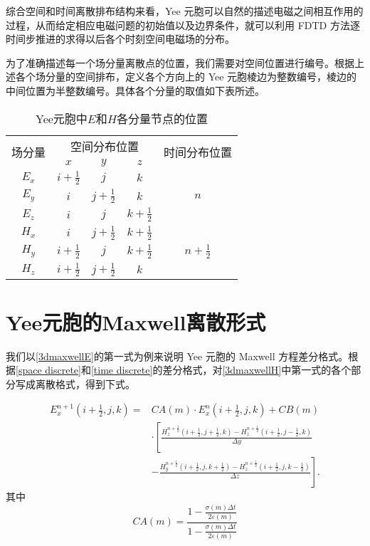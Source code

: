 综合空间和时间离散排布结构来看，Yee 元胞可以自然的描述电磁之间相互作用的过程，从而给定相应电磁问题的初始值以及边界条件，就可以利用 FDTD 方法逐时间步推进的求得以后各个时刻空间电磁场的分布。

为了准确描述每一个场分量离散点的位置，我们需要对空间位置进行编号。根据上述各个场分量的空间排布，定义各个方向上的 Yee 元胞棱边为整数编号，棱边的中间位置为半整数编号。具体各个分量的取值如下表所述。

\begin{table}
\caption{Yee元胞中$\mathbf{\mathit{E}}$和$\mathbf{\mathit{H}}$各分量节点的位置}
	\centering
	\begin{tabular}{ccccc}
		\toprule
		\multirow{2}{3em}{场分量} & \multicolumn{3}{c}{空间分布位置} & \multirow{2}{6em}{时间分布位置}\\
		\cline{2-4}
		& $x$ & $y$ & $z$ &\\
		
		\midrule
		$E_x$ & $i+\frac{1}{2}$ & $j$ & $k$ & \multirow{3}{1em}{$n$}\\
		$E_y$ & $i$ & $j+\frac{1}{2}$ & $k$ & \\
		$E_z$ & $i$ & $j$ & $k+\frac{1}{2}$ & \\
		
		$H_x$ & $i$ & $j+\frac{1}{2}$ & $k+\frac{1}{2}$ & \multirow{3}{3em}{$n+\frac{1}{2}$}\\
		$H_y$ & $i+\frac{1}{2}$ & $j$ & $k+\frac{1}{2}$ & \\
		$H_z$ & $i+\frac{1}{2}$ & $j+\frac{1}{2}$ & $k$ & \\		
		\bottomrule
	\end{tabular}
\end{table}

\section{Yee元胞的Maxwell离散形式}

我们以\eqref{3dmaxwellE}的第一式为例来说明 Yee 元胞的 Maxwell 方程差分格式。根据\eqref{space discrete}和\linebreak[1]\eqref{time discrete}的差分格式，对\eqref{3dmaxwellH}中第一式的各个部分写成离散格式，得到下式。

\begin{equation}\label{ex discrete}
\begin{split}
E^{n+1}_{x}\left( i+\frac{1}{2},j,k \right)=&CA(m) \cdot E^{n}_{x}\left( i+\frac{1}{2},j,k \right)+CB(m)\\
{}&\cdot\left[
\frac{H^{n+\frac{1}{2}}_{z}\left(i+\frac{1}{2},j+\frac{1}{2},k\right)-H^{n+\frac{1}{2}}_{z}\left(i+\frac{1}{2},j-\frac{1}{2},k\right)}{\Delta y}\right.\\
{}&-
\left.\frac{H^{n+\frac{1}{2}}_{y}\left(i+\frac{1}{2},j,k+\frac{1}{2}\right)-H^{n+\frac{1}{2}}_{z}\left(i+\frac{1}{2},j,k-\frac{1}{2}\right)}{\Delta z}
\right].
\end{split}
\end{equation}
其中
\begin{equation}
CA(m)=\frac{
	1-\frac{\sigma(m)\Delta t}{2\varepsilon(m)}
	}{
	1-\frac{\sigma(m)\Delta t}{2\varepsilon(m)}	
	}
\end{equation}

